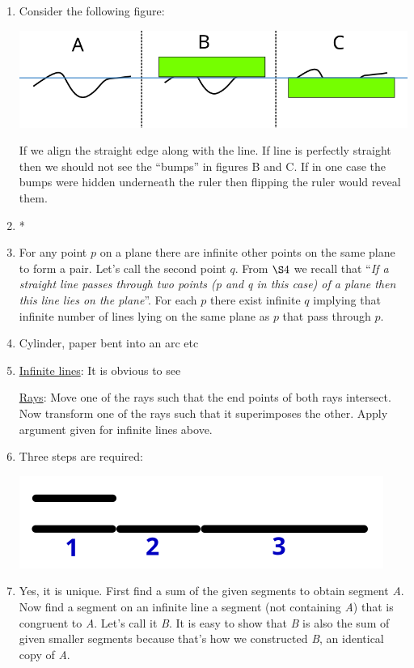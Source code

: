 \begin{enumerate}
	\item Consider the following figure:
	
	\includegraphics[scale=0.75]{chapters/ch00/images/07}
	
	If we align the straight edge along with the line. If line is perfectly straight then we should not see the ``bumps'' in figures B and C. If in one case the bumps were hidden underneath the ruler then flipping the ruler would reveal them.
	
	\item *
	
	\item For any point $p$ on a plane there are infinite other points on the same plane to form a pair. Let's call the second point $q$. From $\S4$ we recall that ``\textit{If a straight line passes through two points (p and q in this case) of a plane then this line lies on the plane}''. For each $p$ there exist infinite $q$ implying that infinite number of lines lying on the same plane as $p$ that pass through $p$.
	
	\item Cylinder, paper bent into an arc etc
	
	\item \underline{Infinite lines}: It is obvious to see
	
	\underline{Rays}: Move one of the rays such that the end points of both rays intersect. Now transform one of the rays such that it superimposes the other. Apply argument given for infinite lines above.
	
	\item Three steps are required:
	
	\includegraphics[scale=1.3]{chapters/ch00/images/12}
	
	\item Yes, it is unique. First find a sum of the given segments to obtain segment \textit{A}. Now find a segment on an infinite line a segment (not containing \textit{A}) that is congruent to \textit{A}. Let's call it \textit{B}. It is easy to show that \textit{B} is also the sum of given smaller segments because that's how we constructed \textit{B}, an identical copy of \textit{A}.
	

\end{enumerate}
